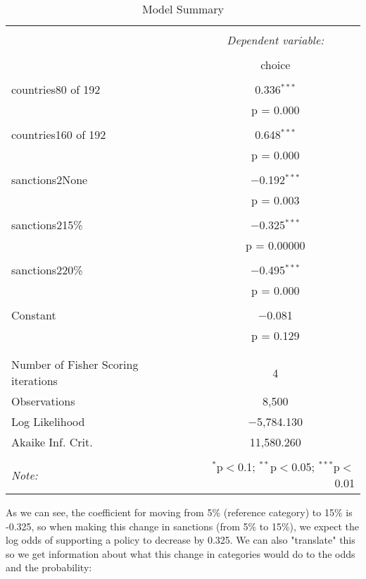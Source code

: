 \documentclass[12pt,letterpaper]{article}
\begin{document}
\begin{enumerate}
\begin{enumerate}
		\begin{table}[!htbp] \centering   \caption{Model Summary}   \label{} \begin{tabular}{@{\extracolsep{5pt}}lc} \\[-1.8ex]\hline \hline \\[-1.8ex]  & \multicolumn{1}{c}{\textit{Dependent variable:}} \\ \cline{2-2} \\[-1.8ex] & choice \\ \hline \\[-1.8ex]  countries80 of 192 & 0.336$^{***}$ \\   & p = 0.000 \\   & \\  countries160 of 192 & 0.648$^{***}$ \\   & p = 0.000 \\   & \\  sanctions2None & $-$0.192$^{***}$ \\   & p = 0.003 \\   & \\  sanctions215\% & $-$0.325$^{***}$ \\   & p = 0.00000 \\   & \\  sanctions220\% & $-$0.495$^{***}$ \\   & p = 0.000 \\   & \\  Constant & $-$0.081 \\   & p = 0.129 \\   & \\ \hline \\[-1.8ex] Number of Fisher Scoring iterations & 4 \\ Observations & 8,500 \\ Log Likelihood & $-$5,784.130 \\ Akaike Inf. Crit. & 11,580.260 \\ \hline \hline \\[-1.8ex] \textit{Note:}  & \multicolumn{1}{r}{$^{*}$p$<$0.1; $^{**}$p$<$0.05; $^{***}$p$<$0.01} \\ \end{tabular} \end{table} 
		
		\vspace{.25cm} 	
		\noindent As we can see, the coefficient for moving from 5\% (reference category) to 15\% is -0.325, so when making this change in sanctions (from 5\% to 15\%), we expect the log odds of supporting a policy to decrease by 0.325. We can also "translate" this so we get information about what this change in categories would do to the odds and the probability: 
		

\end{enumerate}
\end{enumerate}
\end{document}
